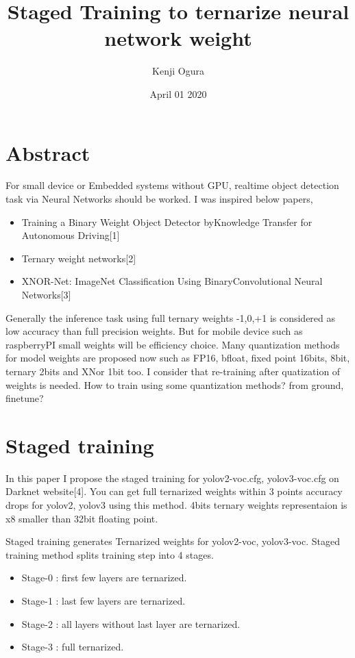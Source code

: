 \documentclass[twocolumn]{article}
\begin{document}
\title{Staged Training to ternarize neural network weight}
\author{Kenji Ogura}
\date{April 01 2020}
\maketitle

\section{Abstract}

For small device or Embedded systems without GPU, realtime object detection task via Neural Networks should be worked.
I was inspired below papers,
\begin{itemize}
\item
 Training a Binary Weight Object Detector byKnowledge Transfer for Autonomous Driving[1]
\item
 Ternary weight networks[2]
\item
 XNOR-Net: ImageNet Classification Using BinaryConvolutional Neural Networks[3]
\end{itemize}

Generally the inference task using full ternary weights -1,0,+1 is considered as low accuracy than full precision weights.
But for mobile device such as raspberryPI small weights will be efficiency choice.
Many quantization methods for model weights are proposed now such as FP16, bfloat, fixed point 16bits, 8bit, ternary 2bits and XNor 1bit too.
I consider that re-training after quatization of weights is needed.
How to train using some quantization methods? from ground, finetune?

\section{Staged training}
In this paper I propose the staged training for yolov2-voc.cfg, yolov3-voc.cfg on Darknet website[4].
You can get full ternarized weights within 3 points accuracy drops for yolov2, yolov3 using this method.
4bits ternary weights representaion is x8 smaller than 32bit floating point.

Staged training generates Ternarized weights for yolov2-voc, yolov3-voc.
Staged training method splits training step into 4 stages.

\begin{itemize}
\item Stage-0 : first few layers are ternarized.
\item Stage-1 : last few layers are ternarized.
\item Stage-2 : all layers without last layer are ternarized.
\item Stage-3 : full ternarized.
\end{itemize}
\end{document}
